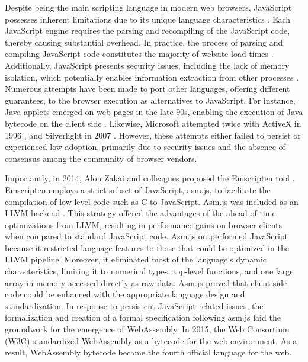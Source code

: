 Despite being the main scripting language in modern web browsers, JavaScript possesses inherent limitations due to its unique language characteristics \cite{mulazzani2013fast}.
Each JavaScript engine requires the parsing and recompiling of the JavaScript code, thereby causing substantial overhead.
In practice, the process of parsing and compiling JavaScript code constitutes the majority of website load times .
Additionally, JavaScript presents security issues, including the lack of memory isolation, which potentially enables information extraction from other processes \cite{10.1145/1190216.1190252, 10.1145/3412841.3442001}.
Numerous attempts have been made to port other languages, offering different guarantees, to the browser execution as alternatives to JavaScript.
For instance, Java applets emerged on web pages in the late 90s, enabling the execution of Java bytecode on the client side .
Likewise, Microsoft attempted twice with ActiveX in 1996 , and Silverlight in 2007 .
However, these attempts either failed to persist or experienced low adoption, primarily due to security issues and the absence of consensus among the community of browser vendors.

 


Importantly, in 2014, Alon Zakai and colleagues proposed the Emscripten tool .
Emscripten employs a strict subset of JavaScript, asm.js, to facilitate the compilation of low-level code such as C to JavaScript.
Asm.js was included as an LLVM backend .
This strategy offered the advantages of the ahead-of-time optimizations from LLVM, resulting in performance gains on browser clients  when compared to standard JavaScript code.
Asm.js outperformed JavaScript because it restricted language features to those that could be optimized in the LLVM pipeline. 
Moreover, it eliminated most of the language's dynamic characteristics, limiting it to numerical types, top-level functions, and one large array in memory accessed directly as raw data.
Asm.js proved that client-side code could be enhanced with the appropriate language design and standardization.
In response to persistent JavaScript-related issues, the formalization and creation of a formal specification following asm.js laid the groundwork for the emergence of WebAssembly.
In 2015, the Web Consortium (W3C) standardized WebAssembly as a bytecode for the web environment.
As a result, WebAssembly bytecode became the fourth official language for the web.


